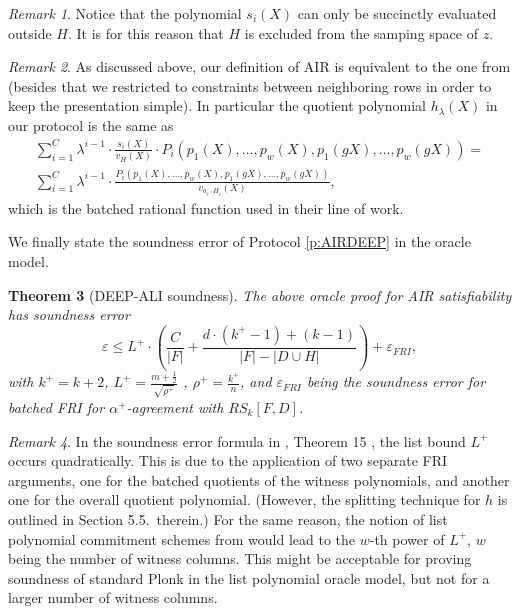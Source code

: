 \documentclass[11pt,article,oneside]{memoir}
\newtheorem{thm}{Theorem}[]
\theoremstyle{definition}
\theoremstyle{remark}
\newtheorem{rem}[thm]{Remark}
\begin{document}
\begin{rem}
Notice that the polynomial $s_i(X)$ can only be succinctly evaluated outside $H$.
It is for this reason that $H$ is excluded from the samping space of $z$.
\end{rem}

\begin{rem}
As discussed above, our definition of AIR is equivalent to the one from \cite{Starks, DEEPFRI, ethSTARK} (besides that we restricted to constraints between neighboring rows in order to keep the presentation simple). 
In particular the quotient polynomial $h_\lambda(X)$ in our protocol is the same as
\begin{multline*}
\sum_{i=1}^{C} \lambda^{i-1} \cdot\frac{ s_i(X)}{v_H(X)}\cdot P_i(p_1(X),\ldots ,p_w(X),p_1(gX), \ldots, p_w(gX)) =
\\
\sum_{i=1}^{C} \lambda^{i-1} \cdot \frac{P_i(p_1(X),\ldots ,p_w(X),p_1(gX), \ldots, p_w(gX))}{v_{a_i\cdot H_i}(X)},
\end{multline*}
which is the batched rational function used in their line of work.
\end{rem}

We finally state the soundness error of Protocol \ref{p:AIRDEEP} in the oracle model.
\begin{thm}[DEEP-ALI soundness]
\label{thm:DEEPsoundness} 
The above oracle proof for AIR satisfiability has soundness error 
\begin{equation}
\label{e:SoundnessDEEPALI}
\varepsilon \leq L^+ \cdot \left(\frac{C}{|F|} + \frac{d\cdot (k^+ - 1) + (k - 1)}{|F| - |D\cup H|}\right) + \varepsilon_{FRI},
\end{equation}
with  $k^+ = k+2$,  $L^+ = \frac{m+\frac{1}{2}}{\sqrt{\rho^+}}$ , $\rho^+=\frac{k^+}{n}$, and $\varepsilon_{FRI}$ being the soundness error for batched FRI for $\alpha^+$-agreement with $RS_k[F,D]$. 
\end{thm}

\begin{rem}
 In the soundness error formula in  \cite{DEEPFRI}, Theorem 15 , the list bound $L^+$ occurs quadratically. 
This is due to the application of two separate FRI arguments, one for the batched quotients of the witness polynomials, and another one for the overall quotient polynomial.  
(However, the splitting technique for $h$ is outlined in Section 5.5.~therein.)
For the same reason, the notion of list polynomial commitment schemes from \cite{Redshift} would lead to the  $w$-th power of $L^+$, $w$ being the number of witness columns.
This might be acceptable for proving soundness of standard Plonk in the list polynomial oracle model, but not for a larger number of witness columns. 
\end{rem}
\end{document}
